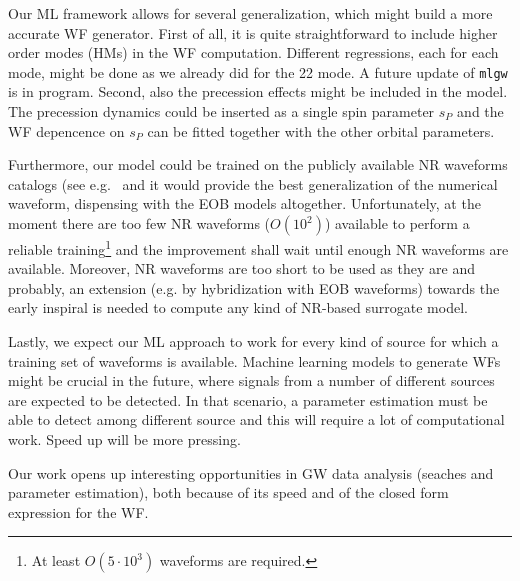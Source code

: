 \par
Our ML framework allows for several generalization, which might build a more accurate WF generator.
First of all, it is quite straightforward to include higher order modes (HMs) in the WF computation. Different regressions, each for each mode, might be done as we already did for the 22 mode. A future update of \texttt{mlgw} is in program.
Second, also the precession effects might be included in the model.
The precession dynamics could be inserted as a single spin parameter $s_P$ \cite{Schmidt2015Precession} and the WF depencence on $s_P$ can be fitted together with the other orbital parameters.
\par
Furthermore, our model could be trained on the publicly available NR waveforms 
catalogs (see e.g.~\cite{Mroue:2013xna,Boyle:2019kee,Healy:2019jyf} and it would provide the best generalization of 
the numerical waveform, dispensing with the EOB models altogether.
Unfortunately, at the moment there are too few NR waveforms ($O(10^2)$) available to perform a reliable 
training\footnote{At least $O(5\cdot 10^3)$ waveforms are required.}
and the improvement shall wait until enough NR waveforms are available.
Moreover, NR waveforms are too short to be used as they are and probably, an extension (e.g. by hybridization with EOB waveforms)
towards the early inspiral is needed to compute any kind of NR-based surrogate model.
\par
Lastly, we expect our ML approach to work for every kind of source for which a training set of 
waveforms is available. Machine learning models to generate WFs might be crucial in 
the future, where signals from a number of different sources are expected to be detected. In that scenario, 
a parameter estimation must be able to detect among different source and this will require a lot 
of computational work. Speed up will be more pressing.
\par

Our work opens up interesting opportunities in GW data analysis (seaches and parameter estimation), both because of its speed and of the closed form expression for the WF.

